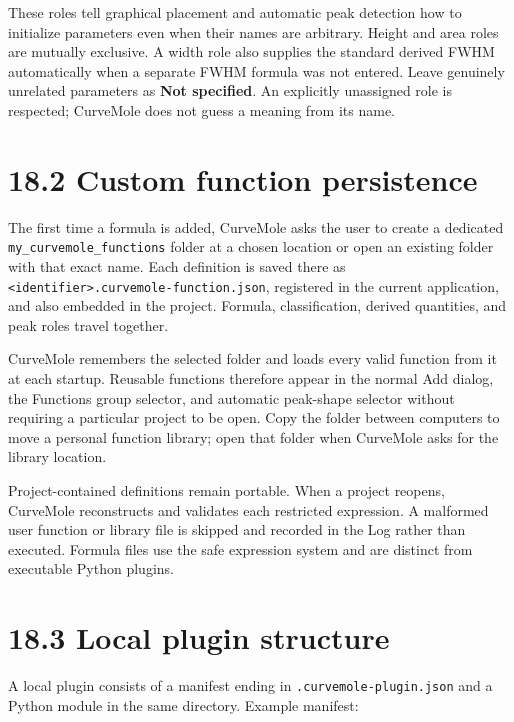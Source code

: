\documentclass[
  10pt,
  a4paper,
  oneside]{scrreprt}
\begin{document}
These roles tell graphical placement and automatic peak detection how to
initialize parameters even when their names are arbitrary. Height and
area roles are mutually exclusive. A width role also supplies the
standard derived FWHM automatically when a separate FWHM formula was not
entered. Leave genuinely unrelated parameters as \textbf{Not specified}.
An explicitly unassigned role is respected; CurveMole does not guess a
meaning from its name.

\hypertarget{custom-function-persistence}{%
\section{18.2 Custom function
persistence}\label{custom-function-persistence}}

The first time a formula is added, CurveMole asks the user to create a
dedicated \texttt{my\_curvemole\_functions} folder at a chosen location
or open an existing folder with that exact name. Each definition is
saved there as
\texttt{\textless{}identifier\textgreater{}.curvemole-function.json},
registered in the current application, and also embedded in the project.
Formula, classification, derived quantities, and peak roles travel
together.

CurveMole remembers the selected folder and loads every valid function
from it at each startup. Reusable functions therefore appear in the
normal Add dialog, the Functions group selector, and automatic
peak-shape selector without requiring a particular project to be open.
Copy the folder between computers to move a personal function library;
open that folder when CurveMole asks for the library location.

Project-contained definitions remain portable. When a project reopens,
CurveMole reconstructs and validates each restricted expression. A
malformed user function or library file is skipped and recorded in the
Log rather than executed. Formula files use the safe expression system
and are distinct from executable Python plugins.

\hypertarget{local-plugin-structure}{%
\section{18.3 Local plugin structure}\label{local-plugin-structure}}

A local plugin consists of a manifest ending in
\texttt{.curvemole-plugin.json} and a Python module in the same
directory. Example manifest:
\end{document}
